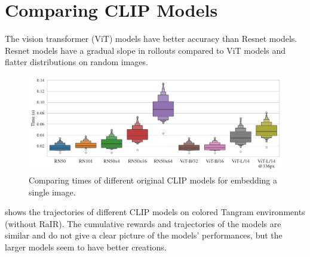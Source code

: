 \chapter{Comparing CLIP Models}
\label{sec:clip-comparison}

The vision transformer (ViT) models have better accuracy than Resnet models.
Resnet models have a gradual slope in rollouts compared to ViT models and flatter distributions on random images.

\begin{figure}[H]
    \centering
    \includegraphics[width=\textwidth]{images/clip_inference_times.pdf}
    \vspace{-12pt}
    \caption{Comparing times of different original CLIP models for embedding a single image.}
    \label{fig:clip-time-comparison}
\end{figure}

 shows the trajectories of different CLIP models on colored Tangram environments (without RaIR).
The cumulative rewards and trajectories of the models are similar and do not give a clear picture of the models' performances, but the larger models seem to have better creations. 


